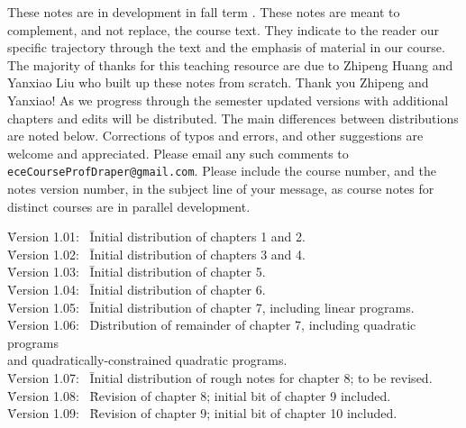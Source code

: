 \documentclass{tufte-book} %
\theoremstyle{definition}
\theoremstyle{remark}
\numberwithin{section}{chapter}
\numberwithin{equation}{chapter}
\numberwithin{figure}{chapter}
\begin{document}
\noindent These notes are in development in fall term \the\year.
These notes are meant to complement, and not replace, the course text.
They indicate to the reader our specific trajectory through the text
and the emphasis of material in our course.  The majority of thanks
for this teaching resource are due to Zhipeng Huang and Yanxiao Liu
who built up these notes from scratch.  Thank you Zhipeng and Yanxiao!
As we progress through the semester updated versions with additional
chapters and edits will be distributed.  The main differences between
distributions are noted below.  Corrections of typos and errors, and
other suggestions are welcome and appreciated.  Please email any such
comments to \texttt{eceCourseProfDraper@gmail.com}.  Please include
the course number, and the notes version number,  in the subject line of your message, as course notes
for distinct courses are in parallel development. \vspace{0.2in} \\

\begin{tabbing}
\noindent \= Version 1.01: \ \= Initial distribution of chapters 1 and 2.\\
\noindent \= Version 1.02: \ \= Initial distribution of chapters 3 and 4.\\
\noindent \= Version 1.03: \ \= Initial distribution of chapter 5.\\
\noindent \= Version 1.04: \ \= Initial distribution of chapter 6.\\
\noindent \= Version 1.05: \ \= Initial distribution of chapter 7, including linear programs.\\
\noindent \= Version 1.06: \ \= Distribution of remainder of chapter 7, including quadratic programs \\ \hspace{6em} and quadratically-constrained quadratic programs.\\
\noindent \= Version 1.07: \ \= Initial distribution of rough notes for chapter 8; to be revised.\\
\noindent \= Version 1.08: \ \= Revision of chapter 8; initial bit of chapter 9 included.\\
\noindent \= Version 1.09: \ \= Revision of chapter 9; initial bit of chapter 10 included.\\

\end{tabbing}

\newpage
\mainmatter
\end{document}

